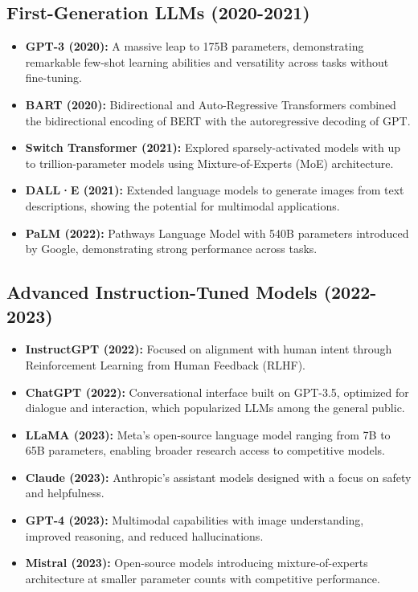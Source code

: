 \documentclass[11pt,a4paper]{report}
\begin{document}
\subsection{First-Generation LLMs (2020-2021)}
\begin{itemize}
    \item \textbf{GPT-3 (2020):} A massive leap to 175B parameters, demonstrating remarkable few-shot learning abilities and versatility across tasks without fine-tuning.
    
    \item \textbf{BART (2020):} Bidirectional and Auto-Regressive Transformers combined the bidirectional encoding of BERT with the autoregressive decoding of GPT.
    
    \item \textbf{Switch Transformer (2021):} Explored sparsely-activated models with up to trillion-parameter models using Mixture-of-Experts (MoE) architecture.
    
    \item \textbf{DALL·E (2021):} Extended language models to generate images from text descriptions, showing the potential for multimodal applications.
    
    \item \textbf{PaLM (2022):} Pathways Language Model with 540B parameters introduced by Google, demonstrating strong performance across tasks.
\end{itemize}

\subsection{Advanced Instruction-Tuned Models (2022-2023)}
\begin{itemize}
    \item \textbf{InstructGPT (2022):} Focused on alignment with human intent through Reinforcement Learning from Human Feedback (RLHF).
    
    \item \textbf{ChatGPT (2022):} Conversational interface built on GPT-3.5, optimized for dialogue and interaction, which popularized LLMs among the general public.
    
    \item \textbf{LLaMA (2023):} Meta's open-source language model ranging from 7B to 65B parameters, enabling broader research access to competitive models.
    
    \item \textbf{Claude (2023):} Anthropic's assistant models designed with a focus on safety and helpfulness.
    
    \item \textbf{GPT-4 (2023):} Multimodal capabilities with image understanding, improved reasoning, and reduced hallucinations.
    
    \item \textbf{Mistral (2023):} Open-source models introducing mixture-of-experts architecture at smaller parameter counts with competitive performance.
\end{itemize}
\end{document}
